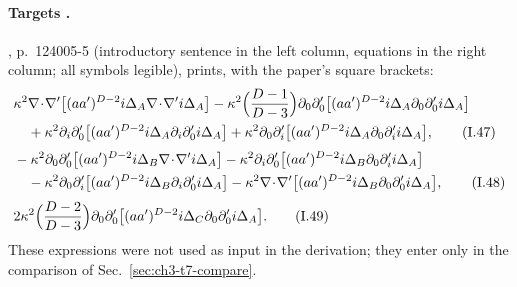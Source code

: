 \paragraph{Targets \tP.}
\PI, p.~124005-5 (introductory sentence in the left column, equations in the right column; all symbols legible), prints, with the paper's square brackets:
\begin{align}
&\kappa^2\nabla\!\cdot\!\nabla'\big[(aa')^{D-2}i\Delta_A\nabla\!\cdot\!\nabla'i\Delta_A\big]-\kappa^2\Big(\frac{D-1}{D-3}\Big)\partial_0\partial'_0\big[(aa')^{D-2}i\Delta_A\partial_0\partial'_0i\Delta_A\big]\notag\\
&\quad+\kappa^2\partial_i\partial'_0\big[(aa')^{D-2}i\Delta_A\partial_i\partial'_0i\Delta_A\big]+\kappa^2\partial_0\partial'_i\big[(aa')^{D-2}i\Delta_A\partial_0\partial'_ii\Delta_A\big],
\tag*{\eqI{47}}\\[3pt]
&-\kappa^2\partial_0\partial'_0\big[(aa')^{D-2}i\Delta_B\nabla\!\cdot\!\nabla'i\Delta_A\big]-\kappa^2\partial_i\partial'_0\big[(aa')^{D-2}i\Delta_B\partial_0\partial'_ii\Delta_A\big]\notag\\
&\quad-\kappa^2\partial_0\partial'_i\big[(aa')^{D-2}i\Delta_B\partial_i\partial'_0i\Delta_A\big]-\kappa^2\nabla\!\cdot\!\nabla'\big[(aa')^{D-2}i\Delta_B\partial_0\partial'_0i\Delta_A\big],
\tag*{\eqI{48}}\\[3pt]
&2\kappa^2\Big(\frac{D-2}{D-3}\Big)\partial_0\partial'_0\big[(aa')^{D-2}i\Delta_C\partial_0\partial'_0i\Delta_A\big].
\tag*{\eqI{49}}
\end{align}
These expressions were not used as input in the derivation; they enter only in the comparison of Sec.~\ref{sec:ch3-t7-compare}.

